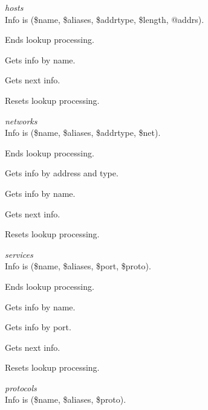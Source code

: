 {\vskip6pt\xiipt\sl hosts} \\
Info is (\$name, \$aliases, \$addrtype, \$length, @addrs).

\begin{enum}{6cm}

	Ends lookup processing.

	Gets info by name.

	Gets next info.

	Resets lookup processing.

\end{enum}

{\vskip6pt\xiipt\sl networks} \\
Info is (\$name, \$aliases, \$addrtype, \$net).

\begin{enum}{6cm}

	Ends lookup processing.

	Gets info by address and type.

	Gets info by name.

	Gets next info.

	Resets lookup processing.

\end{enum}

{\vskip6pt\xiipt\sl services} \\
Info is (\$name, \$aliases, \$port, \$proto).

\begin{enum}{6cm}

	Ends lookup processing.

	Gets info by name. 

	Gets info by port.

	Gets next info.

	Resets lookup processing.

\end{enum}

{\vskip6pt\xiipt\sl protocols} \\

Info is (\$name, \$aliases, \$proto).

